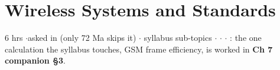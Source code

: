 \section{Wireless Systems and Standards}

{\color{sub}\footnotesize 6 hrs \gap$\cdot$\gap asked in 
(only 72 Ma skips it) \gap$\cdot$ syllabus sub-topics \gap$\cdot$\gap {} \gap$\cdot$\gap {} \gap$\cdot$\gap
{}: the one calculation the syllabus touches, GSM frame
efficiency, is worked in \textbf{Ch 7 companion \S3}.}

